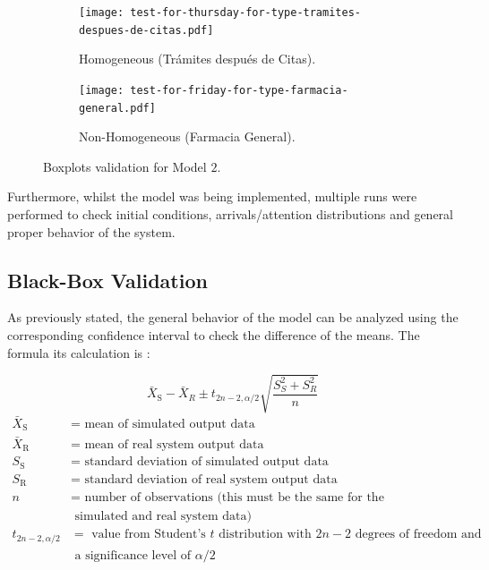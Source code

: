\begin{figure}[H]
        \centering
        \begin{subfigure}[b]{0.475\textwidth}
            \centering
            \texttt{[image: test-for-thursday-for-type-tramites-despues-de-citas.pdf]}
            \caption{Homogeneous (Trámites después de Citas).}
            \label{fig:model_2_homo}
        \end{subfigure}
        \begin{subfigure}[b]{0.475\textwidth}   
            \centering 
            \texttt{[image: test-for-friday-for-type-farmacia-general.pdf]}
            \caption{Non-Homogeneous (Farmacia General).}
            \label{fig:model_2_no_homo}
        \end{subfigure}
        \caption{Boxplots validation for Model $2$.}
        \label{fig:model_2_vali}
\end{figure}


Furthermore, whilst the model was being implemented, multiple runs were performed to check initial conditions, arrivals/attention distributions and general proper behavior of the system.

\subsection{Black-Box Validation}
As previously stated, the general behavior of the model can be analyzed using the corresponding confidence interval to check the difference of the means. The formula its calculation is \cite[pp. 218]{robinson2004simulation}:

\begin{equation}
        \bar{X}_{\mathrm{S}}-\bar{X}_{R} \pm t_{2 n-2, \alpha / 2} \sqrt{\frac{S_{S}^{2}+S_{R}^{2}}{n}}
        \end{equation}
\begin{equation*}
\begin{aligned} \bar{X}_{\mathrm{S}} &=\text { mean of simulated output data } \\ \bar{X}_{\mathrm{R}} &=\text { mean of real system output data } \\ S_{\mathrm{S}} &=\text { standard deviation of simulated output data } \\ S_{\mathrm{R}} &=\text { standard deviation of real system output data } \\ n &=\text { number of observations (this must be the same for the } \\ & \text { simulated and real system data) } \\ t_{2 n-2, \alpha / 2} &=\text { value from Student's } t \text { distribution with } 2 n-2 \text { degrees of freedom and } \\ & \text { a significance level of } \alpha / 2 \end{aligned}
\end{equation*}


